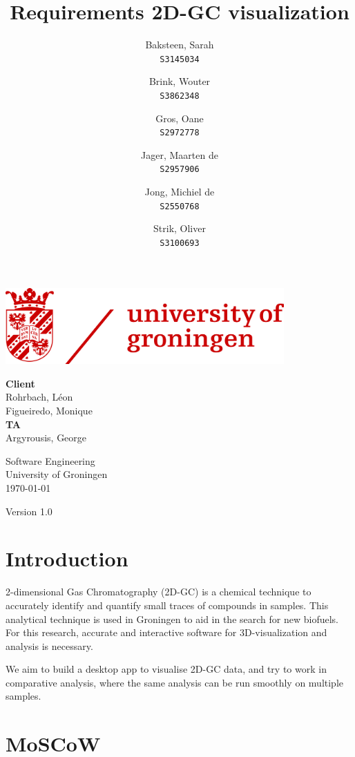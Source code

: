 \documentclass{article}
\title{Requirements 2D-GC visualization}
\author{
  Baksteen, Sarah\\
  \texttt{S3145034}
  \and
  Brink, Wouter\\
  \texttt{S3862348}
  \and
  Gros, Oane\\
  \texttt{S2972778}
  \and
  Jager, Maarten de \\
  \texttt{S2957906}
  \and
  Jong, Michiel de \\
  \texttt{S2550768}
  \and
  Strik, Oliver\\
  \texttt{S3100693}
}
\date{}
\begin{document}
\clearpage
\maketitle
\thispagestyle{empty}
\begin{center}
    \vfill
    \includegraphics[width=0.8\textwidth]{UG_logo.jpg}
    \vfill
    
    \Large
    \textbf{Client} \\
    Rohrbach, Léon \\
    Figueiredo, Monique \\
    
    \vspace{1cm}
    \textbf{TA} \\
    Argyrousis, George
    
    \vspace{2cm}
        Software Engineering \\
        University of Groningen \\
        \today \\
        \empty
        
        \vspace{1cm}
        Version 1.0
\end{center}

\newpage\setcounter{page}{1}
\section{Introduction}

2-dimensional Gas Chromatography (2D-GC) is a chemical technique to accurately identify and quantify small traces of compounds in samples. This analytical technique is used in Groningen to aid in the search for new biofuels. For this research, accurate and interactive software for 3D-visualization and analysis is necessary. 

We aim to build a desktop app to visualise 2D-GC data, and try to work in comparative analysis, where the same analysis can be run smoothly on multiple samples. 



\section{MoSCoW}
\end{document}
